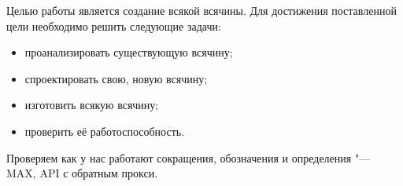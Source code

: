\Introduction

Целью работы является создание всякой всячины. Для достижения поставленной цели необходимо решить следующие задачи:

\begin{itemize}
\item проанализировать существующую всячину;
\item спроектировать свою, новую всячину;
\item изготовить всякую всячину;
\item проверить её работоспособность.
\end{itemize}

Проверяем как у нас работают сокращения, обозначения и определения "---
MAX, 
API 
с обратным прокси.

